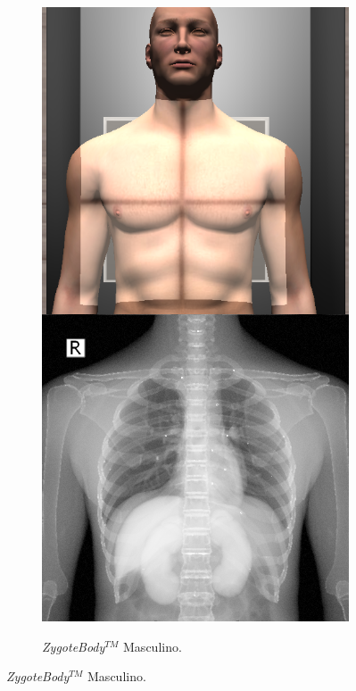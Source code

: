 \begin{figure}[h]
    \begin{subfigure}[b]{0.24\linewidth}
        \centering
        {\includegraphics[width=\linewidth]{IMG/zygoteex.png}}
        \caption{\emph{ZygoteBody}$^{TM}$ Masculino.}

\end{subfigure}
\end{figure}
